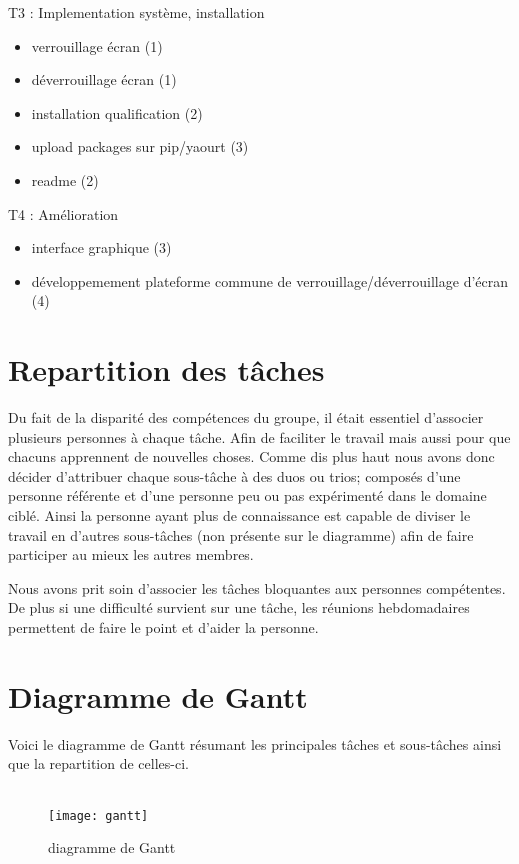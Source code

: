 T3 : Implementation système, installation
\begin{itemize}
  \item{verrouillage écran (1)}
  \item{déverrouillage écran (1)}
  \item{installation qualification (2)}
  \item{upload packages sur pip/yaourt (3)}
  \item{readme (2)}
\end{itemize}

T4 : Amélioration
\begin{itemize}
  \item{interface graphique (3)}
  \item{développemement plateforme commune de verrouillage/déverrouillage
        d’écran (4)}
\end{itemize}

\section{Repartition des tâches}

Du fait de la disparité des compétences du groupe, il était essentiel
d'associer plusieurs personnes à chaque tâche. Afin de faciliter le travail
mais aussi pour que chacuns apprennent de nouvelles choses. Comme dis plus haut
nous avons donc
décider d'attribuer chaque sous-tâche à des duos ou trios; composés d'une
personne référente et d'une personne peu ou pas expérimenté dans le domaine
ciblé. Ainsi la personne ayant plus de connaissance est capable de diviser
le travail en d'autres sous-tâches (non présente sur le diagramme) afin de faire
participer au mieux les autres membres.

Nous avons prit soin d'associer les tâches bloquantes aux personnes
compétentes. De plus si une difficulté survient sur une tâche,
les réunions hebdomadaires permettent de faire le point et d'aider la
personne.

\section{Diagramme de Gantt}
Voici le diagramme de Gantt résumant les principales tâches et sous-tâches
ainsi que la repartition de celles-ci.
\\
\\
\begin{figure}[h]
  \texttt{[image: gantt]}
  \caption{diagramme de Gantt}
\end{figure}
